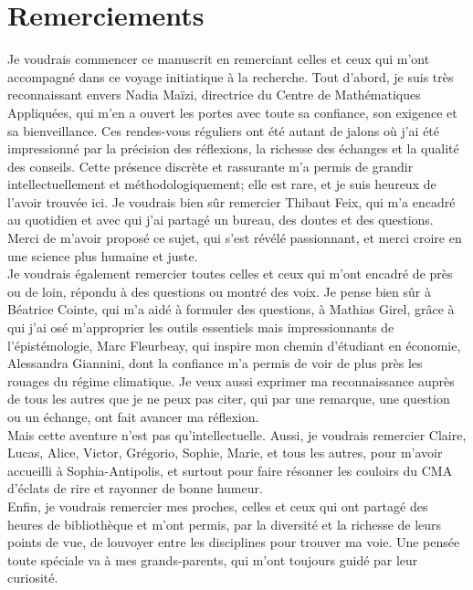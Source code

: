 \chapter*{Remerciements}


Je voudrais commencer ce manuscrit en remerciant celles et ceux qui m'ont accompagné dans ce voyage initiatique à la recherche. Tout d'abord, je suis très reconnaissant envers Nadia Maïzi, directrice du Centre de Mathématiques Appliquées, qui m'en a ouvert les portes avec toute sa confiance, son exigence et sa bienveillance. Ces rendes-vous réguliers ont été autant de jalons où j'ai été impressionné par la précision des réflexions, la richesse des échanges et la qualité des conseils. Cette présence discrète et rassurante m'a permis de grandir intellectuellement et méthodologiquement; elle est rare, et je suis heureux de l'avoir trouvée ici. Je voudrais bien sûr remercier Thibaut Feix, qui m'a encadré au quotidien et avec qui j'ai partagé un bureau, des doutes et des questions. Merci de m'avoir proposé ce sujet, qui s'est révélé passionnant, et merci croire en une science plus humaine et juste. \\



Je voudrais également remercier toutes celles et ceux qui m'ont encadré de près ou de loin, répondu à des questions ou montré des voix. Je pense bien sûr à Béatrice Cointe, qui m'a aidé à formuler des questions, à Mathias Girel, grâce à qui j'ai osé m'approprier les outils essentiels mais impressionnants de l'épistémologie, Marc Fleurbeay, qui inspire mon chemin d'étudiant en économie, Alessandra Giannini, dont la confiance m'a permis de voir de plus près les rouages du régime climatique. Je veux aussi exprimer ma reconnaissance auprès de tous les autres que je ne peux pas citer, qui par une remarque, une question ou un échange, ont fait avancer ma réflexion. \\ 


Mais cette aventure n'est pas qu'intellectuelle. Aussi, je voudrais remercier Claire, Lucas, Alice, Victor, Grégorio, Sophie, Marie, et tous les autres, pour m'avoir accueilli à Sophia-Antipolis, et surtout pour faire résonner les couloirs du CMA d'éclats de rire et rayonner de bonne humeur. \\


Enfin, je voudrais remercier mes proches, celles et ceux qui ont partagé des heures de bibliothèque et m'ont permis, par la diversité et la richesse de leurs points de vue, de louvoyer entre les disciplines pour trouver ma voie. Une pensée toute spéciale va à mes grands-parents, qui m'ont toujours guidé par leur curiosité. 
